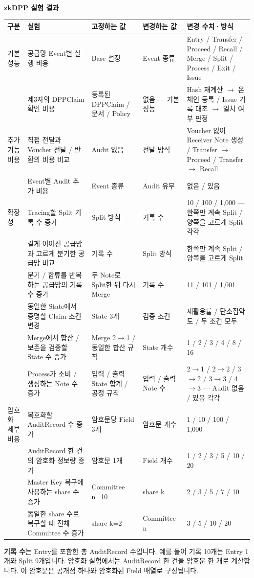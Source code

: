 \documentclass[11pt,a4paper]{article}
\begin{document}
\begin{landscape}
\thispagestyle{empty}
{\Large\bfseries zkDPP 실험 결과}\par\medskip
{\small\begin{longtable}{@{}p{.09\linewidth}p{.255\linewidth}p{.175\linewidth}p{.125\linewidth}p{.29\linewidth}@{}}\toprule
\textbf{구분} & \textbf{실험} & \textbf{고정하는 값} & \textbf{변경하는 값} & \textbf{변경 수치·방식} \\
\midrule\endhead
기본 성능 & 공급망 Event별 실행 비용 & Base 설정 & Event 종류 & Entry / Transfer / Proceed / Recall / Merge / Split / Process / Exit / Issue \\
 & 제3자의 DPPClaim 확인 비용 & 등록된 DPPClaim / 문서 / Policy & 없음 — 기본 성능 & Hash 재계산 $\rightarrow$ 온체인 등록 / Issue 기록 대조 $\rightarrow$ 일치 여부 판정 \\
\midrule
추가 기능 비용 & 직접 전달과 Voucher 전달 / 반환의 비용 비교 & Audit 없음 & 전달 방식 & Voucher 없이 Receiver Note 생성 / Transfer $\rightarrow$ Proceed / Transfer $\rightarrow$ Recall \\
 & Event별 Audit 추가 비용 & Event 종류 & Audit 유무 & 없음 / 있음 \\
\midrule
확장성 & Tracing할 Split 기록 수 증가 & Split 방식 & 기록 수 & 10 / 100 / 1,000 — 한쪽만 계속 Split / 양쪽을 고르게 Split 각각 \\
 & 길게 이어진 공급망과 고르게 분기한 공급망 비교 & 기록 수 & Split 방식 & 한쪽만 계속 Split / 양쪽을 고르게 Split \\
 & 분기 / 합류를 반복하는 공급망의 기록 수 증가 & 두 Note로 Split한 뒤 다시 Merge & 기록 수 & 11 / 101 / 1,001 \\
 & 동일한 State에서 증명할 Claim 조건 변경 & State 3개 & 검증 조건 & 재활용률 / 탄소집약도 / 두 조건 모두 \\
 & Merge에서 합산 / 보존을 검증할 State 수 증가 & Merge 2$\rightarrow$1 / 동일한 합산 규칙 & State 개수 & 1 / 2 / 3 / 4 / 8 / 16 \\
 & Process가 소비 / 생성하는 Note 수 증가 & 입력 / 출력 State 합계 / 공정 규칙 & 입력 / 출력 Note 수 & 2$\rightarrow$1 / 2$\rightarrow$2 / 3$\rightarrow$2 / 3$\rightarrow$3 / 4$\rightarrow$3 — Audit 없음 / 있음 각각 \\
\midrule
암호화 세부 비용 & 복호화할 AuditRecord 수 증가 & 암호문당 Field 3개 & 암호문 개수 & 1 / 10 / 100 / 1,000 \\
 & AuditRecord 한 건의 암호화 정보량 증가 & 암호문 1개 & Field 개수 & 1 / 2 / 3 / 5 / 10 / 20 \\
 & Master Key 복구에 사용하는 share 수 증가 & Committee n=10 & share k & 2 / 3 / 5 / 7 / 10 \\
 & 동일한 share 수로 복구할 때 전체 Committee 수 증가 & share k=2 & Committee n & 3 / 5 / 10 / 20 \\
\bottomrule\end{longtable}}
\textbf{기록 수}는 Entry를 포함한 총 AuditRecord 수입니다.\newline
예를 들어 기록 10개는 Entry 1개와 Split 9개입니다.\newline
암호화 실험에서는 AuditRecord 한 건을 암호문 한 개로 계산합니다.\newline
이 암호문은 공개점 하나와 암호화된 Field 배열로 구성됩니다.


\end{landscape}
\end{document}
